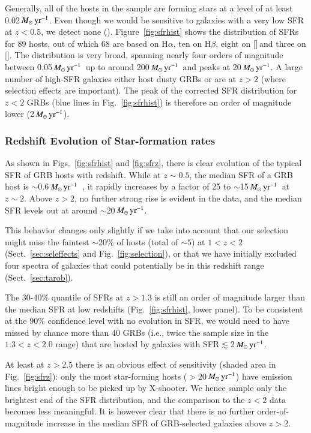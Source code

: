 \documentclass[traditabstract, longauth]{aa}
\newcommand{\hb}{H$\beta$}
\newcommand{\ha}{H$\alpha$}
\newcommand{\oii}{[\ion{O}{ii}]}
\newcommand{\oiii}{[\ion{O}{iii}]}
\newcommand{\Msunyr}{$M_\odot\,\rm{yr}^{-1}$}
\begin{document}
Generally, all of the hosts in the sample are forming stars at a level of at least 0.02\,\Msunyr. Even though we would be sensitive to galaxies with a very low SFR at $z<0.5$, we detect none (\citealp[but see][for a quiescent galaxy at the position of a GRB~050219A]{2014A&A...572A..47R}). Figure~\ref{fig:sfrhist} shows the distribution of SFRs for 89 hosts, out of which 68 are based on \ha, ten on \hb, eight on \oii\,and three on \oiii. The distribution is very broad, spanning nearly four orders of magnitude between 0.05\,\Msunyr\, up to around 200\,\Msunyr\, and peaks at 20\,\Msunyr.  {A large number of high-SFR galaxies either host dusty GRBs or are at $z>2$ (where selection effects are important). The peak of the corrected SFR distribution for $z<2$ GRBs (blue lines in Fig.~\ref{fig:sfrhist}) is therefore an order of magnitude lower (2\,\Msunyr).} 

\subsubsection{Redshift Evolution of Star-formation rates}

As shown in Figs.~\ref{fig:sfrhist} and \ref{fig:sfrz}, there is clear evolution of the typical SFR of GRB hosts with redshift. While at $z\sim0.5$, the median SFR of a GRB host is $\sim0.6$\,\Msunyr\, \citep[see also][]{2009ApJ...691..182S}, it rapidly increases by a factor of 25 to $\sim$15\,\Msunyr\, at $z\sim2$. Above $z>2$, no further strong rise is evident in the data, and the median SFR levels out at around $\sim$20\,\Msunyr. 

 {This behavior changes only slightly if we take into account that our selection might miss the faintest $\sim$20\% of hosts (total of $\sim5$) at $1<z<2$ (Sect.~\ref{sec:seleffects} and Fig.~\ref{fig:selection}), or that we have initially excluded four spectra of galaxies that could potentially be in this redshift range (Sect.~\ref{sec:tarob})}. 

 {The 30-40\% quantile of SFRs at $z > 1.3$ is still an order of magnitude larger than the median SFR at low redshifts (Fig.~\ref{fig:sfrhist}, lower panel). To be consistent at the 90\% confidence level with no evolution in SFR, we would need to have missed by chance more than 40 GRBs (i.e., twice the sample size in the $1.3<z<2.0$ range) that are hosted by galaxies with SFR$\lesssim$2\,\Msunyr.}

At least at $z>2.5$ there is an obvious effect of sensitivity (shaded area in Fig.~\ref{fig:sfrz}): only the most star-forming hosts ($>$20\,\Msunyr) have emission lines bright enough to be picked up by X-shooter. We hence sample only the brightest end of the SFR distribution, and the comparison to the $z<2$ data becomes less meaningful. It is however clear that there is no further order-of-magnitude increase in the median SFR of GRB-selected galaxies above $z > 2$. 
\end{document}
